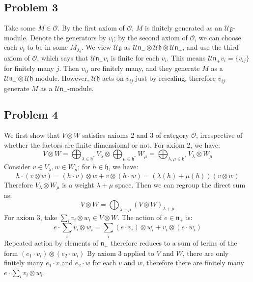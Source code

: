 \documentclass[12 pt]{article}
\newcommand{\fr}{\mathfrak}
\begin{document}
\subsection*{Problem 3}
Take some $M \in \mathcal{O}$. By the first axiom of $\mathcal{O}$, $M$ is finitely generated as an $\mathcal{U}\fr{g}$-module. Denote the generators by $v_i$; by the second axiom of $\mathcal{O}$, we can choose each $v_i$ to be in some $M_{\lambda_i}$. We view $\mathcal{U}\fr{g}$ as $\mathcal{U}\fr{n_-} \otimes \mathcal{U}\fr{h}\otimes \mathcal{U}\fr{n_+}$, and use the third axiom of $\mathcal{O}$, which says that $ \mathcal{U}\fr{n_+} v_i$ is finite for each $v_i$. This means $ \mathcal{U}\fr{n_+} v_i = \{ v_{ij}\}$ for finitely many $j$. Then $v_{ij}$ are finitely many, and they generate $M$ as a $\mathcal{U}\fr{n_-} \otimes \mathcal{U}\fr{h}$-module. However, $\mathcal{U}\fr{h}$ acts on $v_{ij}$ just by rescaling, therefore $v_{ij}$ generate $M$ as a $\mathcal{U}\fr{n_-}$-module.


\subsection*{Problem 4}
We first show that $V\otimes W$ satisfies axioms 2 and 3 of category $\mathcal{O}$, irrespective of whether the factors are finite dimensional or not. For axiom 2, we have:
\[      V \otimes W = \bigoplus_{\lambda \in \fr h^*} V_{\lambda} \otimes \bigoplus_{\mu \in \fr h^*} W_{\mu}  = \bigoplus_{\lambda, \mu \in \fr h^*} V_{\lambda} \otimes W_{\mu}          \]
Consider $v \in V_{\lambda}, w\in W_{\mu}$; for $h \in \fr h$, we have:
\[    h \cdot( v\otimes w) = (h \cdot v) \otimes w + v \otimes (h\cdot w) = (\lambda(h) + \mu(h))(v\otimes w)     \]
Therefore $V_{\lambda} \otimes W_{\mu}$ is a weight $\lambda + \mu$ space. Then we can regroup the direct sum as:
\[        V \otimes W = \bigoplus_{\lambda + \mu}  (V\otimes W)_{\lambda + \mu}     \]
For axiom 3, take $\sum_i v_i\otimes w_i \in V\otimes W$. The action of $e \in \fr {n_+}$ is:
\[     e \cdot \sum_i v_i \otimes w_i = \sum_i (e \cdot v_i) \otimes w_i + v_i \otimes(e \cdot w_i)   \]
Repeated action by elements of $\fr{n_+}$ therefore reduces to a sum of terms of the form $(e_1 \cdot v_i) \otimes (e_2 \cdot w_i)$ By axiom 3 applied to $V$ and $W$, there are only finitely many $e_1 \cdot v$ and $e_2 \cdot w$ for each $v$ and $w$, therefore there are finitely many $e \cdot \sum_i v_i \otimes w_i$.
\end{document}
